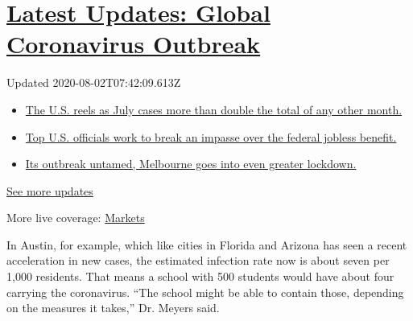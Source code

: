 \hypertarget{latest-updates-global-coronavirus-outbreak}{%
\section{\texorpdfstring{\href{https://www.nytimes.com/2020/08/01/world/coronavirus-covid-19.html?action=click\&pgtype=Article\&state=default\&region=MAIN_CONTENT_1\&context=storylines_live_updates}{Latest
Updates: Global Coronavirus
Outbreak}}{Latest Updates: Global Coronavirus Outbreak}}\label{latest-updates-global-coronavirus-outbreak}}

Updated 2020-08-02T07:42:09.613Z

\begin{itemize}
\tightlist
\item
  \href{https://www.nytimes.com/2020/08/01/world/coronavirus-covid-19.html?action=click\&pgtype=Article\&state=default\&region=MAIN_CONTENT_1\&context=storylines_live_updates\#link-34047410}{The
  U.S. reels as July cases more than double the total of any other
  month.}
\item
  \href{https://www.nytimes.com/2020/08/01/world/coronavirus-covid-19.html?action=click\&pgtype=Article\&state=default\&region=MAIN_CONTENT_1\&context=storylines_live_updates\#link-780ec966}{Top
  U.S. officials work to break an impasse over the federal jobless
  benefit.}
\item
  \href{https://www.nytimes.com/2020/08/01/world/coronavirus-covid-19.html?action=click\&pgtype=Article\&state=default\&region=MAIN_CONTENT_1\&context=storylines_live_updates\#link-2bc8948}{Its
  outbreak untamed, Melbourne goes into even greater lockdown.}
\end{itemize}

\href{https://www.nytimes.com/2020/08/01/world/coronavirus-covid-19.html?action=click\&pgtype=Article\&state=default\&region=MAIN_CONTENT_1\&context=storylines_live_updates}{See
more updates}

More live coverage:
\href{https://www.nytimes.com/live/2020/07/31/business/stock-market-today-coronavirus?action=click\&pgtype=Article\&state=default\&region=MAIN_CONTENT_1\&context=storylines_live_updates}{Markets}

In Austin, for example, which like cities in Florida and Arizona has
seen a recent acceleration in new cases, the estimated infection rate
now is about seven per 1,000 residents. That means a school with 500
students would have about four carrying the coronavirus. ``The school
might be able to contain those, depending on the measures it takes,''
Dr. Meyers said.

